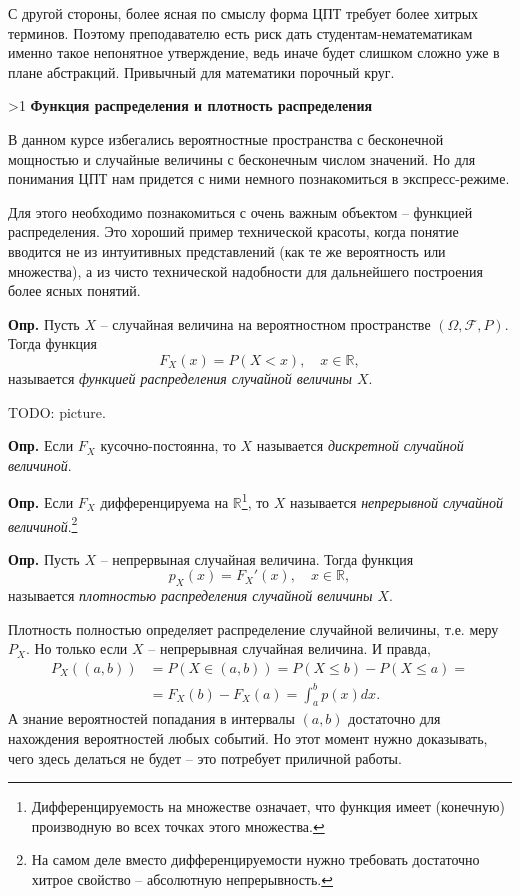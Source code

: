 \documentclass[a4paper,12pt]{article}
\renewcommand{\le}{\leqslant}
\newcommand{\R}{\mathbb{R}}
\newcounter{th-counter}
\newcounter{df-counter}
\newcounter{col-counter}
\newcommand{\df}{\par\noindent\textbf{Опр.} }
\newcounter{subpoint}[subsection]
\renewcommand{\thesubpoint}{\arabic{subpoint}}
\newcommand{\subpoint}[1]{%
  \refstepcounter{subpoint}%
  \ifnum\value{subpoint}>1
    \vspace{1em}%
  \fi
  \noindent\textbf{%
    \fcolorbox{black}{white}{\thesubpoint}\quad #1}%
  \par\vspace{0.2em}%
}
\begin{document}
С другой стороны, более ясная по смыслу форма ЦПТ требует более хитрых терминов. Поэтому преподавателю есть риск дать студентам-нематематикам именно такое непонятное утверждение, ведь иначе будет слишком сложно уже в плане абстракций. Привычный для математики порочный круг.

\subpoint{Функция распределения и плотность распределения}
В данном курсе избегались вероятностные пространства с бесконечной мощностью и случайные величины с бесконечным числом значений. Но для понимания ЦПТ нам придется с ними немного познакомиться в экспресс-режиме.

Для этого необходимо познакомиться с очень важным объектом -- функцией распределения. Это хороший пример технической красоты, когда понятие вводится не из интуитивных представлений (как те же вероятность или множества), а из чисто технической надобности для дальнейшего построения более ясных понятий.

\df Пусть $X$ -- случайная величина на вероятностном пространстве $(\Omega, \mathcal{F}, P)$. Тогда функция
\[
F_X(x) = P(X < x), \quad x \in \R,
\]
называется \textit{функцией распределения случайной величины $X$}.

TODO: picture.

\df Если $F_X$ кусочно-постоянна, то $X$ называется \textit{дискретной случайной величиной}.

\df Если $F_X$ дифференцируема на $\R$\footnote{Дифференцируемость на множестве означает, что функция имеет (конечную) производную во всех точках этого множества.}, то $X$ называется \textit{непрерывной случайной величиной}.\footnote{На самом деле вместо дифференцируемости нужно требовать достаточно хитрое свойство -- абсолютную непрерывность.}

\df Пусть $X$ -- непрервыная случайная величина. Тогда функция 
\[
p_X(x) = F_X'(x), \quad x \in \R,
\]
называется \textit{плотностью распределения случайной величины $X$}.

Плотность полностью определяет распределение случайной величины, т.е. меру $P_X$. Но только если $X$ -- непрерывная случайная величина. И правда,
\begin{align*}
    P_X ((a,b)) &= P (X \in (a,b)) = P(X \le b) - P(X \le a) =\\
    & = F_X(b) - F_X(a) = \int_a^b p(x) dx.
\end{align*}
А знание вероятностей попадания в интервалы $(a,b)$ достаточно для нахождения вероятностей любых событий. Но этот момент нужно доказывать, чего здесь делаться не будет -- это потребует приличной работы.
\end{document}
